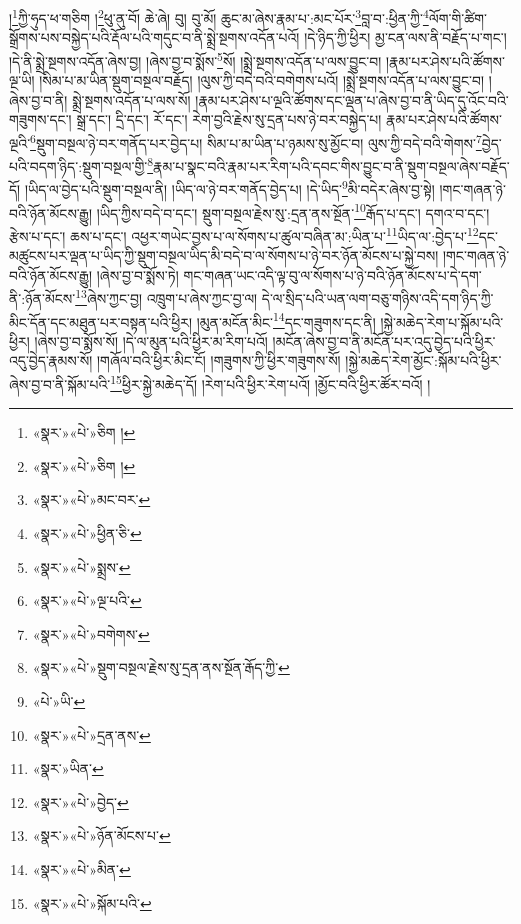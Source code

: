 །\footnote{«སྣར་»«པེ་»ཅིག །}ཀྱི་ཧུད་ཕ་གཅིག །\footnote{«སྣར་»«པེ་»ཅིག །}ཕུ་ནུ་བོ། ཆེ་ཞེ། བུ། བུ་མོ། ཆུང་མ་ཞེས་རྣམ་པ་:མང་པོར་\footnote{«སྣར་»«པེ་»མང་བར་}བླ་བ་:ཕྱིན་ཀྱི་\footnote{«སྣར་»«པེ་»ཕྱིན་ཅི་}ལོག་གི་ཚིག་སྒྲོགས་པས་བསྐྱེད་པའི་རྡོལ་པའི་གདུང་བ་ནི་སྨྲེ་སྔགས་འདོན་པའོ། །དེ་ཉིད་ཀྱི་ཕྱིར། མྱ་ངན་ལས་ནི་བརྗོད་པ་གང་། །དེ་ནི་སྨྲེ་སྔགས་འདོན་ཞེས་བྱ། །ཞེས་བྱ་བ་སྨོས་\footnote{«སྣར་»«པེ་»སྨྲས་}སོ། །སྨྲེ་སྔགས་འདོན་པ་ལས་བྱུང་བ། །རྣམ་པར་ཤེས་པའི་ཚོགས་ལྔ་ཡི། །སིམ་པ་མ་ཡིན་སྡུག་བསྔལ་བརྗོད། །ལུས་ཀྱི་བདེ་བའི་བགེགས་པའོ། །སྨྲེ་སྔགས་འདོན་པ་ལས་བྱུང་བ། །ཞེས་བྱ་བ་ནི། སྨྲེ་སྔགས་འདོན་པ་ལས་སོ། །རྣམ་པར་ཤེས་པ་ལྔའི་ཚོགས་དང་ལྡན་པ་ཞེས་བྱ་བ་ནི་ཡིད་དུ་འོང་བའི་གཟུགས་དང་། སྒྲ་དང་། དྲི་དང་། རོ་དང་། རེག་བྱའི་རྗེས་སུ་དྲན་པས་ཉེ་བར་བསྐྱེད་པ། རྣམ་པར་ཤེས་པའི་ཚོགས་ལྔའི་\footnote{«སྣར་»«པེ་»ལྔ་པའི་}སྡུག་བསྔལ་ཉེ་བར་གནོད་པར་བྱེད་པ། སིམ་པ་མ་ཡིན་པ་ཉམས་སུ་མྱོང་བ། ལུས་ཀྱི་བདེ་བའི་གེགས་\footnote{«སྣར་»«པེ་»བགེགས་}བྱེད་པའི་བདག་ཉིད་:སྡུག་བསྔལ་གྱི་\footnote{«སྣར་»«པེ་»སྡུག་བསྔལ་རྗེས་སུ་དྲན་ནས་སྔོན་རྒོད་ཀྱི་}རྣམ་པ་སྣང་བའི་རྣམ་པར་རིག་པའི་དབང་གིས་བྱུང་བ་ནི་སྡུག་བསྔལ་ཞེས་བརྗོད་དོ། །ཡིད་ལ་བྱེད་པའི་སྡུག་བསྔལ་ནི། །ཡིད་ལ་ཉེ་བར་གནོད་བྱེད་པ། །དེ་ཡིད་\footnote{«པེ་»ཡི་}མི་བདེར་ཞེས་བྱ་སྟེ། །གང་གཞན་ཉེ་བའི་ཉོན་མོངས་རྒྱུ། །ཡིད་ཀྱིས་བདེ་བ་དང་། སྡུག་བསྔལ་རྗེས་སུ་:དྲན་ནས་སྔོན་\footnote{«སྣར་»«པེ་»དྲན་ནས་}རྒོད་པ་དང་། དགའ་བ་དང་། རྩེས་པ་དང་། ཆས་པ་དང་། འཕྱར་གཡེང་བྱས་པ་ལ་སོགས་པ་ཚུལ་བཞིན་མ་:ཡིན་པ་\footnote{«སྣར་»ཡིན་}ཡིད་ལ་:བྱེད་པ་\footnote{«སྣར་»«པེ་»བྱེད་}དང་མཚུངས་པར་ལྡན་པ་ཡིད་ཀྱི་སྡུག་བསྔལ་ཡིད་མི་བདེ་བ་ལ་སོགས་པ་ཉེ་བར་ཉོན་མོངས་པ་སྐྱེ་བས། །གང་གཞན་ཉེ་བའི་ཉོན་མོངས་རྒྱུ། །ཞེས་བྱ་བ་སྨོས་ཏེ། གང་གཞན་ཡང་འདི་ལྟ་བུ་ལ་སོགས་པ་ཉེ་བའི་ཉོན་མོངས་པ་དེ་དག་ནི་:ཉོན་མོངས་\footnote{«སྣར་»«པེ་»ཉོན་མོངས་པ་}ཞེས་ཀྱང་བྱ། འཁྲུག་པ་ཞེས་ཀྱང་བྱ་ལ། དེ་ལ་སྲིད་པའི་ཡན་ལག་བཅུ་གཉིས་འདི་དག་ཉིད་ཀྱི་མིང་དོན་དང་མཐུན་པར་བསྟན་པའི་ཕྱིར། །མུན་མངོན་མིང་\footnote{«སྣར་»«པེ་»མིན་}དང་གཟུགས་དང་ནི། །སྐྱེ་མཆེད་རེག་པ་སྐོམ་པའི་ཕྱིར། །ཞེས་བྱ་བ་སྨོས་སོ། །དེ་ལ་མུན་པའི་ཕྱིར་མ་རིག་པའོ། །མངོན་ཞེས་བྱ་བ་ནི་མངོན་པར་འདུ་བྱེད་པའི་ཕྱིར་འདུ་བྱེད་རྣམས་སོ། །གཞོལ་བའི་ཕྱིར་མིང་ངོ། །གཟུགས་ཀྱི་ཕྱིར་གཟུགས་སོ། །སྐྱེ་མཆེད་རེག་མྱོང་:སྐོམ་པའི་ཕྱིར་ཞེས་བྱ་བ་ནི་སྐོམ་པའི་\footnote{«སྣར་»«པེ་»སྐོམ་པའི་}ཕྱིར་སྐྱེ་མཆེད་དོ། །རེག་པའི་ཕྱིར་རེག་པའོ། །མྱོང་བའི་ཕྱིར་ཚོར་བའོ། །
